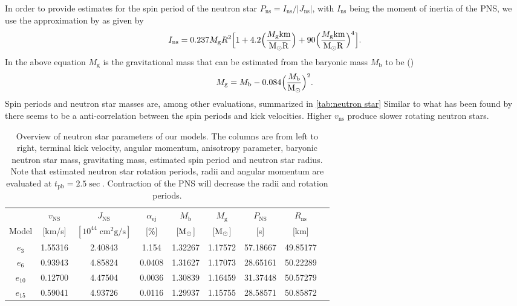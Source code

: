 \documentclass[fleqn,usenatbib]{mnras}
\newcommand{\tpb}{\ensuremath{t_\mathrm{pb}}}
\newcommand{\solm}{\xspace\ensuremath{\rm{M_{\odot}}}}
\newcommand{\rns}{$R_{\mathrm{ns}}$\xspace\xspace}
\begin{document}
In order to provide estimates for the spin period of the neutron star $P_{\mathrm{ns}}=I_{\mathrm{ns}}/|J_{\mathrm{ns}}|$, with $I_{\mathrm{ns}}$ being the moment of inertia of the PNS, we use the approximation by \citet{Lattimer2005} as given by
\begin{equation}
    I_{\mathrm{ns}} = 0.237M_{\mathrm{g}}R^2\Big[ 1 + 
    4.2 \Big( \frac{M_{\mathrm{g}} \mathrm{km }}{\solm R}\Big)  + 
    90 \Big( \frac{M_{\mathrm{g}} \mathrm{km }}{\solm R}\Big)^4
    \Big].
    \label{equ: ins}
\end{equation}
In the above equation $M_{\mathrm{g}}$ is the gravitational mass that can be estimated from the baryonic mass $M_{\mathrm{b}}$ to be (\citet{Lattimer2000})
\begin{equation}
    M_{\mathrm{g}} = M_{\mathrm{b}} - 0.084\Big( \frac{M_{\mathrm{b}}}{\solm}\Big)^2.
\end{equation}Spin periods and neutron star masses are, among other evaluations, summarized in \autoref{tab:neutron star}
Similar to what has been found by \citet{Muller2018b} there seems to be a anti-correlation between the spin periods and kick velocities. Higher $v_{\mathrm{ns}}$ produce slower rotating neutron stars.

\begin{table}
\centering
\begin{tabular}{ccccccccc}
            & $v_{\mathrm{NS}}$& $J_{\mathrm{NS}}$    & $\alpha_{\mathrm{ej}}$& $M_{\mathrm{b}}$& $M_{\mathrm{g}}$ & $P_{\mathrm{NS}}$& \rns \\
    Model & [km/s]           & $[10^{44}\; \mathrm{cm^2 g/s}]$ &         [\%]              &  [\solm]        &  [\solm]         & [s]              &  [km] \\
    
    \hline 
    $e_{3}$  &      1.55316 &             2.40843 &   1.154 &     1.32267 &      1.17572 &  57.18667 &  49.85177 \\
    $e_{6}$  &      0.93943 &             4.85824 &   0.0408 &     1.31627 &      1.17073 &  28.65161 &  50.22289 \\
    $e_{10}$ &      0.12700 &             4.47504 &   0.0036 &     1.30839 &      1.16459 &  31.37448 &  50.57279 \\
    $e_{15}$ &      0.59041 &             4.93726 &   0.0116 &     1.29937 &      1.15755 &  28.58571 &  50.85872
\end{tabular}
\caption{Overview of neutron star parameters of our models. The columns are from left to right, terminal kick velocity, angular momentum, anisotropy parameter, baryonic neutron star mass, gravitating mass, estimated spin period and neutron star radius. Note that estimated neutron star rotation periods, radii and angular momentum are evaluated at $\tpb=2.5\sec$. Contraction of the PNS will decrease the radii and rotation periods. }
\label{tab:neutron star}
\end{table}
\end{document}
